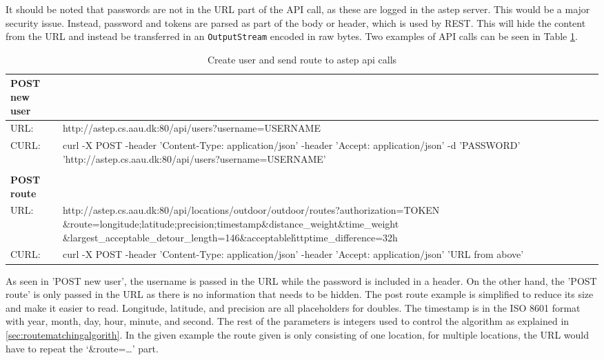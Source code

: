 It should be noted that passwords are not in the URL part of the API call, as these are logged in the \gls{astep} server. 
This would be a major security issue.
Instead, password and tokens are parsed as part of the body or header, which is used by REST. 
This will hide the content from the URL and instead be transferred in an \texttt{OutputStream} encoded in raw bytes. 
Two examples of API calls can be seen in Table \ref{tab:apitable}.

\begin{table}[h]
	\scriptsize
	\centering
	\begin{tabularx}{\textwidth}{l X}
		\textbf{POST new user} &  \\\toprule
		URL:          & http://astep.cs.aau.dk:80/api/users?username=USERNAME  \\
		\rowcolor{blue!10}
		CURL:         & curl -X POST -\-header 'Content-Type: application/json' -\-header 'Accept: application/json' -d 'PASSWORD' 'http://astep.cs.aau.dk:80/api/users?username=USERNAME' \\\\
		\textbf{POST route} & \\\toprule
		URL:          & http://astep.cs.aau.dk:80/api/locations/outdoor/outdoor/routes?authorization=TOKEN
						\&route=longitude;latitude;precision;timestamp\&distance\_weight\&time\_weight
						\&largest\_acceptable\_detour\_length=146\&acceptable\'httptime\_difference=32h\\ 
		\rowcolor{blue!10}
		CURL:         & curl -X POST -\-header 'Content-Type: application/json' -\-header 'Accept: application/json' 'URL from above' \\
	\end{tabularx}
	\caption{Create user and send route to \gls{astep} api calls}
	\label{tab:apitable}
\end{table}


As seen in 'POST new user', the username is passed in the URL while the password is included in a header.
On the other hand, the 'POST route' is only passed in the URL as there is no information that needs to be hidden.
The post route example is simplified to reduce its size and make it easier to read.
Longitude, latitude, and precision are all placeholders for doubles.
The timestamp is in the ISO 8601 format with year, month, day, hour, minute, and second.  
The rest of the parameters is integers used to control the algorithm as explained in \ref{sec:routematchingalgorith}. 
In the given example the route given is only consisting of one location, for multiple locations, the URL would have to repeat the \enquote*{\&route=\dots} part.


